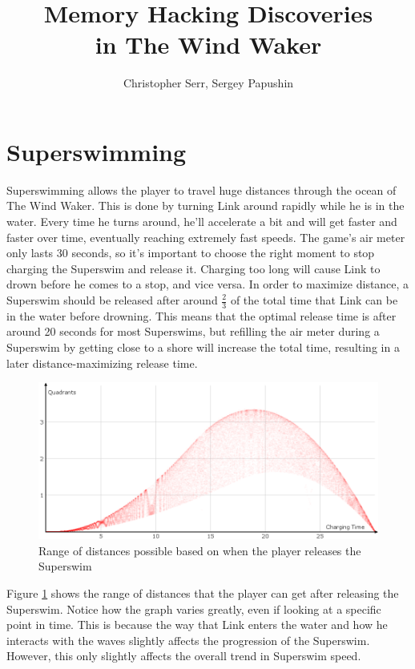 \documentclass[titlepage,12pt,a4paper]{article}
\title{Memory Hacking Discoveries\\in The Wind Waker}
\author{Christopher Serr, Sergey Papushin}
\let\stdsection\section
\renewcommand\section{\newpage\stdsection}
\begin{document}
\maketitle


\tableofcontents
\clearpage

\section{Superswimming}
Superswimming allows the player to travel huge distances through the ocean of The Wind Waker. This is done by turning Link around rapidly while he is in the water. Every time he turns around, he'll accelerate a bit and will get faster and faster over time, eventually reaching extremely fast speeds. The game's air meter only lasts 30 seconds, so it's important to choose the right moment to stop charging the Superswim and release it. Charging too long will cause Link to drown before he comes to a stop, and vice versa. In order to maximize distance, a Superswim should be released after around $\frac{2}{3}$ of the total time that Link can be in the water before drowning. This means that the optimal release time is after around 20 seconds for most Superswims, but refilling the air meter during a Superswim by getting close to a shore will increase the total time, resulting in a later distance-maximizing release time.

\begin{figure}[!htb]
	\centering
	\includegraphics[width=\textwidth]{SSDistance}
	\caption{Range of distances possible based on when the player releases the Superswim}
	\label{fig:SSDistance}
\end{figure}

Figure \ref{fig:SSDistance} shows the range of distances that the player can get after releasing the Superswim. Notice how the graph varies greatly, even if looking at a specific point in time. This is because the way that Link enters the water and how he interacts with the waves slightly affects the progression of the Superswim. However, this only slightly affects the overall trend in Superswim speed. 
\end{document}
